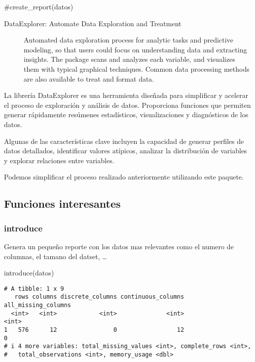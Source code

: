 \documentclass[
  letterpaper,
  DIV=11,
  numbers=noendperiod]{scrreprt}
\newenvironment{Shaded}{\begin{snugshade}}{\end{snugshade}}
\newcommand{\CommentTok}[1]{\textcolor[rgb]{0.37,0.37,0.37}{#1}}
\newcommand{\FunctionTok}[1]{\textcolor[rgb]{0.28,0.35,0.67}{#1}}
\newcommand{\NormalTok}[1]{\textcolor[rgb]{0.00,0.23,0.31}{#1}}
\begin{document}
\begin{Shaded}
\begin{Highlighting}[]
\CommentTok{\#create\_report(datos)}
\end{Highlighting}
\end{Shaded}

\begin{description}
\item[DataExplorer: Automate Data Exploration and Treatment]
Automated data exploration process for analytic tasks and predictive
modeling, so that users could focus on understanding data and extracting
insights. The package scans and analyzes each variable, and visualizes
them with typical graphical techniques. Common data processing methods
are also available to treat and format data.
\end{description}

La librería DataExplorer es una herramienta diseñada para simplificar y
acelerar el proceso de exploración y análisis de datos. Proporciona
funciones que permiten generar rápidamente resúmenes estadísticos,
visualizaciones y diagnósticos de los datos.

Algunas de las características clave incluyen la capacidad de generar
perfiles de datos detallados, identificar valores atípicos, analizar la
distribución de variables y explorar relaciones entre variables.

Podemos simplificar el proceso realizado anteriormente utilizando este
paquete.

\subsection{Funciones interesantes}\label{funciones-interesantes}

\subsubsection{introduce}\label{introduce}

Genera un pequeño reporte con los datos mas relevantes como el numero de
columnas, el tamano del datset, \ldots{}

\begin{Shaded}
\begin{Highlighting}[]
\FunctionTok{introduce}\NormalTok{(datos)}
\end{Highlighting}
\end{Shaded}

\begin{verbatim}
# A tibble: 1 x 9
   rows columns discrete_columns continuous_columns all_missing_columns
  <int>   <int>            <int>              <int>               <int>
1   576      12                0                 12                   0
# i 4 more variables: total_missing_values <int>, complete_rows <int>,
#   total_observations <int>, memory_usage <dbl>
\end{verbatim}
\end{document}
